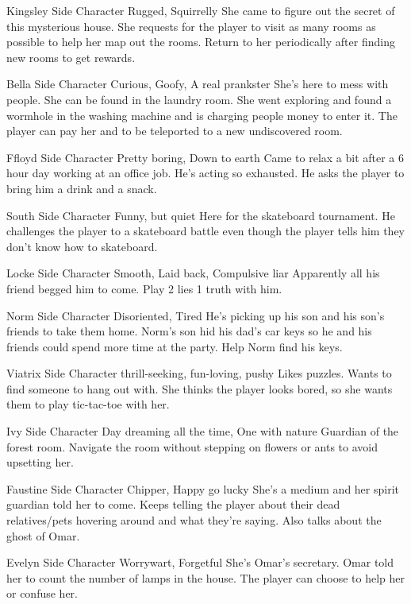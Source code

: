 {Kingsley}
{Side Character}
{Rugged, Squirrelly}
{She came to figure out the secret of this mysterious house.}
{She requests for the player to visit as many rooms as possible to help her map out the rooms. Return to her periodically after finding new rooms to get rewards.}

{Bella}
{Side Character}
{Curious, Goofy, A real prankster}
{She's here to mess with people.}
{She can be found in the laundry room. She went exploring and found a wormhole in the washing machine and is charging people money to enter it. The player can pay her and to be teleported to a new undiscovered room.}

{Ffloyd}
{Side Character}
{Pretty boring, Down to earth}
{Came to relax a bit after a 6 hour day working at an office job.}
{He's acting so exhausted. He asks the player to bring him a drink and a snack.}

{South}
{Side Character}
{Funny, but quiet}
{Here for the skateboard tournament.}
{He challenges the player to a skateboard battle even though the player tells him they don't know how to skateboard.}

{Locke}
{Side Character}
{Smooth, Laid back, Compulsive liar}
{Apparently all his friend begged him to come.}
{Play 2 lies 1 truth with him.}

{Norm}
{Side Character}
{Disoriented, Tired}
{He's picking up his son and his son's friends to take them home.}
{Norm's son hid his dad's car keys so he and his friends could spend more time at the party. Help Norm find his keys.}

{Viatrix}
{Side Character}
{thrill-seeking, fun-loving, pushy}
{Likes puzzles. Wants to find someone to hang out with.}
{She thinks the player looks bored, so she wants them to play tic-tac-toe with her.}

{Ivy}
{Side Character}
{Day dreaming all the time, One with nature}
{Guardian of the forest room.}
{Navigate the room without stepping on flowers or ants to avoid upsetting her.}

{Faustine}
{Side Character}
{Chipper, Happy go lucky}
{She's a medium and her spirit guardian told her to come.}
{Keeps telling the player about their dead relatives/pets hovering around and what they're saying. Also talks about the ghost of Omar.}

{Evelyn}
{Side Character}
{Worrywart, Forgetful}
{She's Omar's secretary.}
{Omar told her to count the number of lamps in the house. The player can choose to help her or confuse her.}


